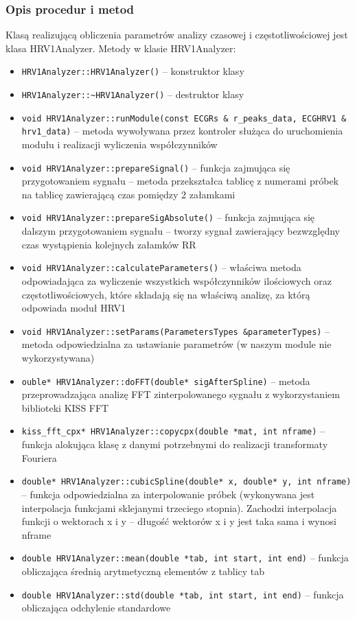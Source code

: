 \documentclass[a4paper, 11pt]{article}
\begin{document}
\subsubsection{Opis procedur i metod}
\label{sec:hrv1:procs}
Klasą realizującą obliczenia parametrów analizy czasowej i częstotliwościowej jest klasa HRV1Analyzer.
Metody w klasie HRV1Analyzer:
\begin{itemize}
\item \verb+HRV1Analyzer::HRV1Analyzer()+ -- konstruktor klasy
\item \verb+HRV1Analyzer::~HRV1Analyzer()+ -- destruktor klasy
\item \verb+void HRV1Analyzer::runModule(const ECGRs & r_peaks_data, ECGHRV1 & hrv1_data)+ -- metoda wywoływana przez kontroler służąca do uruchomienia modułu i realizacji wyliczenia współczynników
\item \verb+void HRV1Analyzer::prepareSignal()+ -- funkcja zajmująca się przygotowaniem sygnału -- metoda przekształca tablicę z numerami próbek na tablicę zawierającą czas pomiędzy 2 załamkami
\item \verb+void HRV1Analyzer::prepareSigAbsolute()+ -- funkcja zajmująca się dalszym przygotowaniem sygnału -- tworzy sygnał zawierający bezwzględny czas wystąpienia kolejnych załamków RR
\item \verb+void HRV1Analyzer::calculateParameters()+ -- właściwa metoda odpowiadająca za wyliczenie wszystkich współczynników ilościowych oraz częstotliwościowych, które składają się na właściwą analizę, za którą odpowiada moduł HRV1
\item \verb+void HRV1Analyzer::setParams(ParametersTypes &parameterTypes)+ -- metoda odpowiedzialna za ustawianie parametrów (w naszym module nie wykorzystywana)
\item \verb+ouble* HRV1Analyzer::doFFT(double* sigAfterSpline)+ -- metoda przeprowadzająca analizę FFT zinterpolowanego sygnału z wykorzystaniem biblioteki KISS FFT
\item \verb+kiss_fft_cpx* HRV1Analyzer::copycpx(double *mat, int nframe)+ -- funkcja alokująca klasę z danymi potrzebnymi do realizacji transformaty Fouriera
\item \verb+double* HRV1Analyzer::cubicSpline(double* x, double* y, int nframe)+ -- funkcja odpowiedzialna za interpolowanie próbek (wykonywana jest interpolacja funkcjami sklejanymi trzeciego stopnia). Zachodzi interpolacja funkcji o wektorach x i y  -- długość wektorów x i y jest taka sama i wynosi nframe
\item \verb+double HRV1Analyzer::mean(double *tab, int start, int end)+ -- funkcja obliczająca średnią arytmetyczną elementów z tablicy tab
\item \verb+double HRV1Analyzer::std(double *tab, int start, int end)+ -- funkcja obliczająca odchylenie standardowe
\end{itemize}
\end{document}
